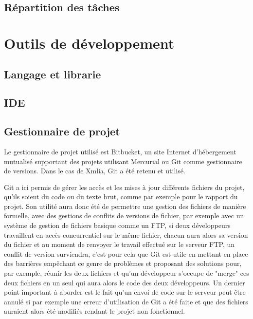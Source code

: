         \subsection{Répartition des tâches}

\section{Outils de développement}

        \subsection{Langage et librarie}

        \subsection{IDE}

        \subsection{Gestionnaire de projet}
        Le gestionnaire de projet utilisé est Bitbucket, un site Internet d'hébergement mutualisé supportant des projets utilisant Mercurial ou Git comme gestionnaire de versions. Dans le cas de Xmlia, Git a été retenu et utilisé.
        
        Git a ici permis de gérer les accès et les mises à jour différents fichiers du projet, qu'ils soient du code ou du texte brut, comme par exemple pour le rapport du projet. Son utilité aura donc été de permettre une gestion des fichiers de manière formelle, avec des gestions de conflits de versions de fichier, par exemple avec un système de gestion de fichiers basique comme un FTP, si deux développeurs travaillent en accès concurrentiel sur le même fichier, chacun aura alors sa version du fichier et au moment de renvoyer le travail effectué sur le serveur FTP, un conflit de version surviendra, c'est pour cela que Git est utile en mettant en place des barrières empêchant ce genre de problèmes et proposant des solutions pour, par exemple, réunir les deux fichiers et qu'un développeur s'occupe de "merge" ces deux fichiers en un seul qui aura alors le code des deux développeurs. Un dernier point important à aborder est le fait qu'un envoi de code sur le serveur peut être annulé si par exemple une erreur d'utilisation de Git a été faite et que des fichiers auraient alors été modifiés rendant le projet non fonctionnel.
       
